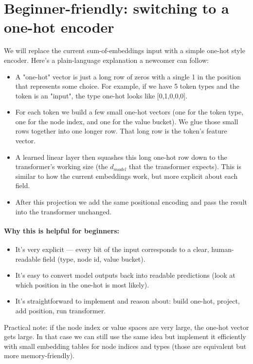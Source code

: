 \documentclass{article}
\begin{document}
\section*{Beginner-friendly: switching to a one-hot encoder}
We will replace the current sum-of-embeddings input with a simple one-hot style encoder. Here's a plain-language explanation a newcomer can follow:

\begin{itemize}
  \item A "one-hot" vector is just a long row of zeros with a single 1 in the position that represents some choice. For example, if we have 5 token types and the token is an "input", the type one-hot looks like [0,1,0,0,0].
  \item For each token we build a few small one-hot vectors (one for the token type, one for the node index, and one for the value bucket). We glue those small rows together into one longer row. That long row is the token's feature vector.
  \item A learned linear layer then squashes this long one-hot row down to the transformer's working size (the \(d_{model}\) that the transformer expects). This is similar to how the current embeddings work, but more explicit about each field.
  \item After this projection we add the same positional encoding and pass the result into the transformer unchanged.
\end{itemize}

\paragraph{Why this is helpful for beginners:}
\begin{itemize}
  \item It's very explicit — every bit of the input corresponds to a clear, human-readable field (type, node id, value bucket).
  \item It's easy to convert model outputs back into readable predictions (look at which position in the one-hot is most likely).
  \item It's straightforward to implement and reason about: build one-hot, project, add position, run transformer.
\end{itemize}

Practical note: if the node index or value spaces are very large, the one-hot vector gets large. In that case we can still use the same idea but implement it efficiently with small embedding tables for node indices and types (those are equivalent but more memory-friendly).
\end{document}
